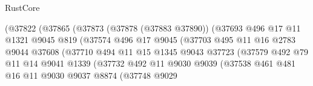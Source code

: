 \begin{lexlean}{RustCore}
\begin{coremodule}
                                (@37822
                                  (@37865
                                    (@37873
                                      (@37878 (@37883 @37890))
                                      (@37693
                                        @496
                                        @17
                                        @11
                                        @1321
                                        @9045
                                        @819
                                        (@37574
                                          @496
                                          @17
                                          @9045
                                          (@37703
                                            @495
                                            @11
                                            @16
                                            @2783
                                            @9044
                                            @37608
                                            (@37710
                                              @494
                                              @11
                                              @15
                                              @1345
                                              @9043
                                              @37723
                                              (@37579
                                                @492
                                                @79
                                                @11
                                                @14
                                                @9041
                                                @1339
                                                (@37732
                                                  @492
                                                  @11
                                                  @9030
                                                  @9039
                                                  (@37538
                                                    @461
                                                    @481
                                                    @16
                                                    @11
                                                    @9030
                                                    @9037
                                                    @8874
                                                    (@37748
                                                      @9029

\end{coremodule}
\end{lexlean}
